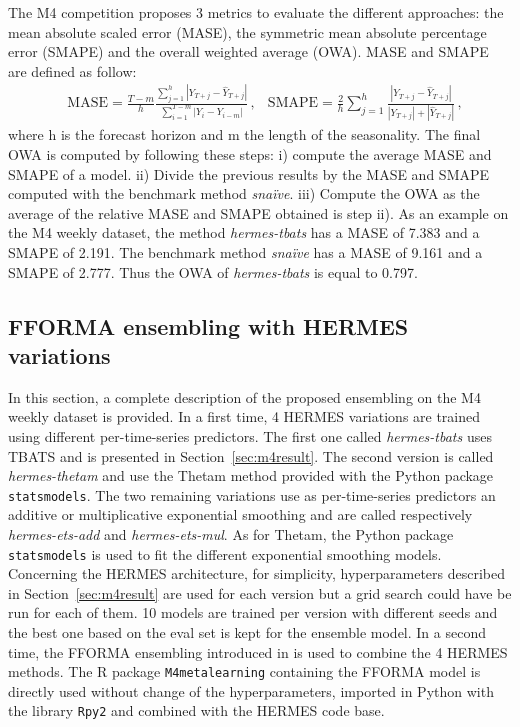 \documentclass[10pt]{article} %
\begin{document}
The M4 competition proposes 3 metrics to evaluate the different approaches: the mean absolute scaled error (MASE), the symmetric mean absolute percentage error (SMAPE) and the overall weighted average (OWA). MASE and SMAPE are defined as follow:
\begin{align*}
&\mathrm{MASE} = \frac{T-m}{h}\frac{\sum_{j=1}^h |Y_{T+j} - \hat{Y}_{T+j}| }{\sum_{i=1}^{T-m} |Y_i - Y_{i-m}|}\,,
&\mathrm{SMAPE} = \frac{2}{h}\sum_{j=1}^h\frac{|Y_{T+j} - \hat{Y}_{T+j}|}{|Y_{T+j}| + |\hat{Y}_{T+j}|}\,,
\end{align*}
where h is the forecast horizon and m the length of the seasonality. The final OWA is computed by following these steps: i) compute the average MASE and SMAPE of a model. ii) Divide the previous results by the MASE and SMAPE computed with the benchmark method \textit{snaïve}. iii) Compute the OWA as the average of the relative MASE and SMAPE obtained is step ii). As an example on the M4 weekly dataset, the method \textit{hermes-tbats} has a MASE of 7.383 and a SMAPE of 2.191. The benchmark method \textit{snaïve} has a MASE of 9.161 and a SMAPE of 2.777. Thus the OWA of  \textit{hermes-tbats} is equal to 0.797.

\subsection{FFORMA ensembling with HERMES variations}
\label{sec:fforma-hermes}

In this section, a complete description of the proposed ensembling on the M4 weekly dataset is provided. In a first time, 4 HERMES variations are trained using different per-time-series predictors. The first one called \textit{hermes-tbats} uses TBATS and is presented in Section~\ref{sec:m4result}. The second version is called \textit{hermes-thetam} and use the Thetam method provided with the Python package \texttt{statsmodels}. The two remaining variations use as per-time-series predictors an additive or multiplicative exponential smoothing and are called respectively \textit{hermes-ets-add} and \textit{hermes-ets-mul}. As for Thetam, the Python package \texttt{statsmodels} is used to fit the different exponential smoothing models. Concerning the HERMES architecture, for simplicity, hyperparameters described in Section~\ref{sec:m4result} are used for each version but a grid search could have be run for each of them. 10 models are trained per version with different seeds and the best one based on the eval set is kept for the ensemble model. In a second time, the FFORMA ensembling introduced in \citet{montero2020} is used to combine the 4 HERMES methods. The R package \texttt{M4metalearning} containing the FFORMA model is directly used without change of the hyperparameters, imported in Python with the library \texttt{Rpy2} and combined with the HERMES code base.
\end{document}
